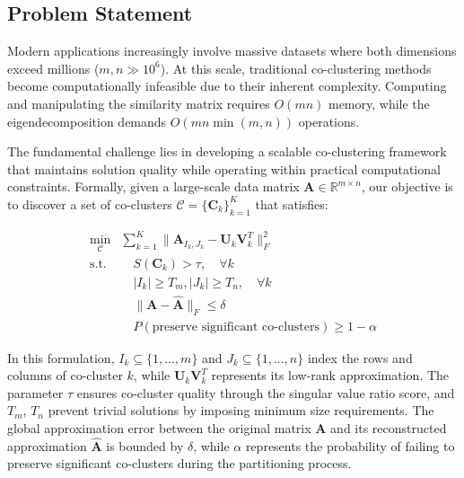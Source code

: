 \documentclass[journal]{IEEEtran}
\begin{document}
\subsection{Problem Statement}
Modern applications increasingly involve massive datasets where both dimensions exceed millions ($m,n \gg 10^6$). At this scale, traditional co-clustering methods become computationally infeasible due to their inherent complexity. Computing and manipulating the similarity matrix requires $O(mn)$ memory, while the eigendecomposition demands $O(mn\min(m,n))$ operations.

The fundamental challenge lies in developing a scalable co-clustering framework that maintains solution quality while operating within practical computational constraints. Formally, given a large-scale data matrix $\mathbf{A} \in \mathbb{R}^{m \times n}$, our objective is to discover a set of co-clusters $\mathcal{C} = \{\mathbf{C}_k\}_{k=1}^K$ that satisfies:

\begin{equation}
    \begin{aligned}
        \min_{\mathcal{C}} & \sum_{k=1}^K \|\mathbf{A}_{I_k,J_k} - \mathbf{U}_k\mathbf{V}_k^T\|_F^2 \\
        \text{s.t.}        & \quad S(\mathbf{C}_k) > \tau, \quad \forall k                          \\
                           & \quad |I_k| \geq T_m, |J_k| \geq T_n, \quad \forall k                  \\
                           & \quad \|\mathbf{A} - \hat{\mathbf{A}}\|_F \leq \delta                  \\
                           & \quad P(\text{preserve significant co-clusters}) \geq 1 - \alpha
    \end{aligned}
\end{equation}

In this formulation, $I_k \subseteq \{1,...,m\}$ and $J_k \subseteq \{1,...,n\}$ index the rows and columns of co-cluster $k$, while $\mathbf{U}_k\mathbf{V}_k^T$ represents its low-rank approximation. The parameter $\tau$ ensures co-cluster quality through the singular value ratio score, and $T_m$, $T_n$ prevent trivial solutions by imposing minimum size requirements. The global approximation error between the original matrix $\mathbf{A}$ and its reconstructed approximation $\hat{\mathbf{A}}$ is bounded by $\delta$, while $\alpha$ represents the probability of failing to preserve significant co-clusters during the partitioning process.
\end{document}
